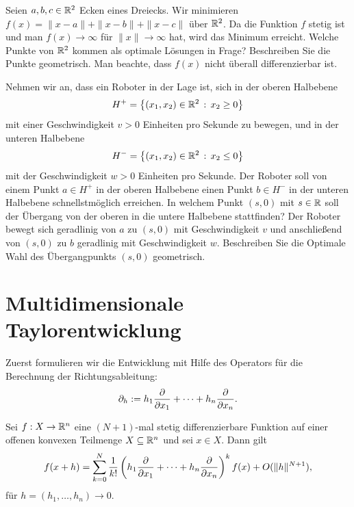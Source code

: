 \begin{aufg}
	Seien $a, b, c \in \mathbb{R}^2$ Ecken eines Dreiecks. Wir minimieren $f(x) = \|x - a\| +\|x-b\| + \|x - c\|$ über $\mathbb{R}^2$. Da die Funktion $f$ stetig ist und man $f(x) \to \infty$ für $\|x\| \to \infty$ hat, wird das Minimum erreicht. Welche Punkte von $\mathbb{R}^2$ kommen als optimale Lösungen in Frage? Beschreiben Sie die Punkte geometrisch.
	Man beachte, dass $f(x)$ nicht überall differenzierbar ist. 
\end{aufg} 

\begin{aufg}
	Nehmen wir an, dass ein Roboter in der Lage ist, sich in der oberen Halbebene 
	\[
		H^+ = \left\{ (x_1,x_2) \in \mathbb{R}^2 \,:\, x_2 \ge 0 \right\}
	\] mit einer Geschwindigkeit $v>0$ Einheiten pro Sekunde zu bewegen, und in der unteren Halbebene 
	\[
		H^- = \left\{ (x_1,x_2) \in \mathbb{R}^2 \,:\, x_2 \le 0 \right\}
	\] mit der Geschwindigkeit $w>0$ Einheiten pro Sekunde. Der Roboter soll von einem Punkt $a \in H^+$ in der oberen Halbebene einen Punkt $b \in H^-$ in der unteren Halbebene schnellstmöglich erreichen. In welchem Punkt $(s,0)$ mit $s \in \mathbb{R}$ soll der Übergang von der oberen in die untere Halbebene stattfinden? Der Roboter bewegt sich geradlinig von $a$ zu $(s,0)$ mit Geschwindigkeit $v$ und anschließend von $(s,0)$ zu $b$ geradlinig mit Geschwindigkeit $w$. Beschreiben Sie die Optimale Wahl des Übergangpunkts $(s,0)$ geometrisch. 
\end{aufg} 

\section{Multidimensionale Taylorentwicklung} 

\begin{bem}
	Zuerst formulieren wir die Entwicklung mit Hilfe des Operators für die Berechnung der Richtungsableitung:
	\[
		\partial_h := h_1 \frac{\partial }{\partial x_1} +  \cdots + h_n \frac{\partial }{\partial x_n}. 
	\]
\end{bem} 

\begin{thm}
	\label{thm:multdim:taylor:hilf}
	Sei $ f : X \to \mathbb{R}^n$ eine $(N+1)$-mal stetig differenzierbare Funktion auf einer offenen konvexen Teilmenge $X \subseteq \mathbb{R}^n$ und sei $x \in X$. Dann gilt 
	\begin{equation}
		\label{eq:multidim:taylor:formel:hiilfs}
		f(x+h) = 	\sum_{k=0}^N \frac{1}{k!} \left(h_1 \frac{\partial }{\partial x_1} +  \cdots + h_n \frac{\partial }{\partial x_n} \right)^k f (x) + O(\|h\|^{N+1}),
	\end{equation}
	für $h = (h_1,\ldots,h_n) \to 0$.
\end{thm} 

